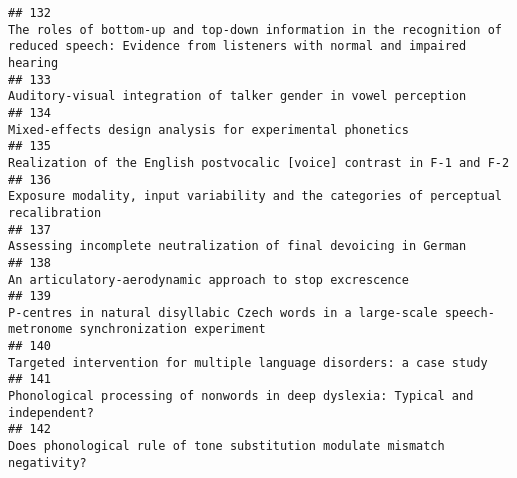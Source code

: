 \documentclass[
  english,
  man]{apa6}
\begin{document}
\begin{verbatim}
## 132                                                                                           The roles of bottom-up and top-down information in the recognition of reduced speech: Evidence from listeners with normal and impaired hearing
## 133                                                                                                                                                                         Auditory-visual integration of talker gender in vowel perception
## 134                                                                                                                                                                                 Mixed-effects design analysis for experimental phonetics
## 135                                                                                                                                                                   Realization of the English postvocalic [voice] contrast in F-1 and F-2
## 136                                                                                                                                                      Exposure modality, input variability and the categories of perceptual recalibration
## 137                                                                                                                                                                         Assessing incomplete neutralization of final devoicing in German
## 138                                                                                                                                                                                 An articulatory-aerodynamic approach to stop excrescence
## 139                                                                                                                                 P-centres in natural disyllabic Czech words in a large-scale speech-metronome synchronization experiment
## 140                                                                                                                                                                      Targeted intervention for multiple language disorders: a case study
## 141                                                                                                                                                           Phonological processing of nonwords in deep dyslexia: Typical and independent?
## 142                                                                                                                                                                Does phonological rule of tone substitution modulate mismatch negativity?

\end{verbatim}
\end{document}
